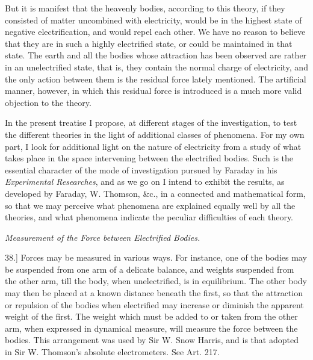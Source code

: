 \documentclass[11pt,a4paper]{article}
\begin{document}
But it is manifest that the heavenly bodies, according to this theory,
if they consisted of matter uncombined with electricity, would be in the
highest state of negative electrification, and would repel each other.
We have no reason to believe that they are in such a highly electrified
state, or could be maintained in that state. The earth and all the
bodies whose attraction has been observed are rather in an unelectrified
state, that is, they contain the normal charge of electricity, and the
only action between them is the residual force lately mentioned. The
artificial manner, however, in which this residual force is introduced
is a much more valid objection to the theory.

In the present treatise I propose, at different stages of the
investigation, to test the different theories in the light of additional
classes of phenomena. For my own part, I look for additional light on
the nature of electricity from a study of what takes place in the space
intervening between the electrified bodies. Such is the essential
character of the mode of investigation pursued by Faraday in his
\textit{Experimental Researches}, and as we go on I intend to exhibit
the results, as developed by Faraday, W. Thomson, \&c., in a connected
and mathematical form, so that we may perceive what phenomena are
explained equally well by all the theories, and what phenomena indicate
the peculiar difficulties of each theory.

\begin{center}
\textit{Measurement of the Force between Electrified Bodies.}
\end{center}

38.] Forces may be measured in various ways. For instance, one of the
bodies may be suspended from one arm of a delicate balance, and weights
suspended from the other arm, till the body, when unelectrified, is in
equilibrium. The other body may then be placed at a known distance
beneath the first, so that the attraction or repulsion of the bodies
when electrified may increase or diminish the apparent weight of the
first. The weight which must be added to or taken from the other arm,
when expressed in dynamical measure, will measure the force between the
bodies. This arrangement was used by Sir W. Snow Harris, and is that
adopted in Sir W. Thomson's absolute electrometers. See Art. 217.

\clearpage
\setcounter{footnote}{0}
\end{document}
